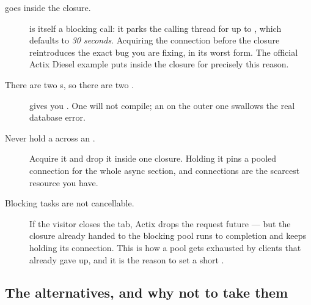 \begin{description}
  \item[ goes inside the closure.]  is itself a blocking call: it
    parks the calling thread for up to , which defaults to
    \emph{30 seconds}. Acquiring the connection before the closure reintroduces the exact bug you
    are fixing, in its worst form. The official Actix Diesel example puts  inside the
    closure for precisely this reason.

  \item[There are two s, so there are two .]
     gives you
    . One  will not compile; an 
    on the outer one swallows the real database error.

  \item[Never hold a  across an .] Acquire it and drop it
    inside one closure. Holding it pins a pooled connection for the whole async section, and
    connections are the scarcest resource you have.

  \item[Blocking tasks are not cancellable.] If the visitor closes the tab, Actix drops the
    request future --- but the closure already handed to the blocking pool runs to completion and
    keeps holding its connection. This is how a pool gets exhausted by clients that already gave
    up, and it is the reason to set a short .
\end{description}

\subsection{The alternatives, and why not to take them}

